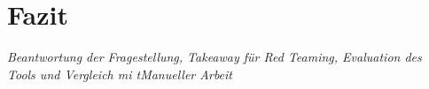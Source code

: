 \section{Fazit}

\textit{Beantwortung der Fragestellung, Takeaway für Red Teaming, Evaluation des Tools und Vergleich mi tManueller Arbeit}
